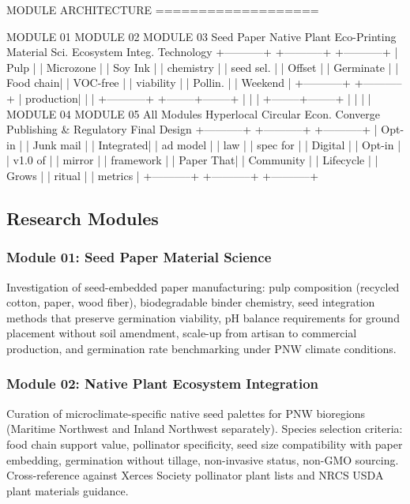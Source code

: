 \documentclass[11pt,letterpaper]{article}
\begin{document}
\begin{asciibox}
MODULE ARCHITECTURE
===================

  MODULE 01         MODULE 02         MODULE 03
  Seed Paper        Native Plant      Eco-Printing
  Material Sci.     Ecosystem Integ.  Technology
  +-----------+     +-----------+     +-----------+
  | Pulp      |     | Microzone |     | Soy Ink   |
  | chemistry |     | seed sel. |     | Offset    |
  | Germinate |     | Food chain|     | VOC-free  |
  | viability |     | Pollin.   |     | Weekend   |
  +-----------+     +-----------+     | production|
       |                 |            +-----------+
       +--------+--------+                 |
                |                          |
       +--------+--------+                 |
       |                 |                 |
  MODULE 04         MODULE 05         All Modules
  Hyperlocal        Circular Econ.    Converge
  Publishing        & Regulatory      Final Design
  +-----------+     +-----------+     +-----------+
  | Opt-in    |     | Junk mail |     | Integrated|
  | ad model  |     | law       |     | spec for  |
  | Digital   |     | Opt-in    |     | v1.0 of   |
  | mirror    |     | framework |     | Paper That|
  | Community |     | Lifecycle |     | Grows     |
  | ritual    |     | metrics   |     +-----------+
  +-----------+     +-----------+
\end{asciibox}

\subsection{Research Modules}

\subsubsection{Module 01: Seed Paper Material Science}
Investigation of seed-embedded paper manufacturing: pulp composition (recycled cotton, paper, wood fiber), biodegradable binder chemistry, seed integration methods that preserve germination viability, pH balance requirements for ground placement without soil amendment, scale-up from artisan to commercial production, and germination rate benchmarking under PNW climate conditions.

\subsubsection{Module 02: Native Plant Ecosystem Integration}
Curation of microclimate-specific native seed palettes for PNW bioregions (Maritime Northwest and Inland Northwest separately). Species selection criteria: food chain support value, pollinator specificity, seed size compatibility with paper embedding, germination without tillage, non-invasive status, non-GMO sourcing. Cross-reference against Xerces Society pollinator plant lists and NRCS USDA plant materials guidance.
\end{document}
